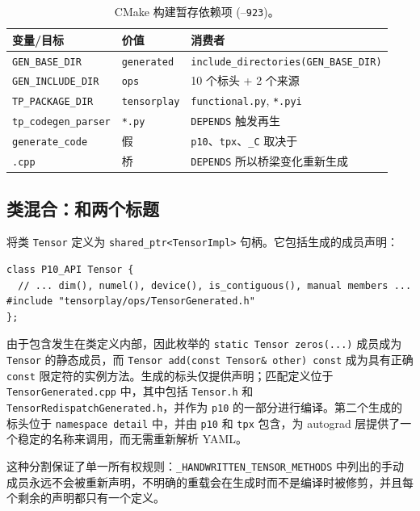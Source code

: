 \begin{table}[H]
\centering
\caption{CMake 构建暂存依赖项 (--\texttt{923})。}
\label{tab:cmakedep}
\small
\begin{tabular}{lll}
\toprule
变量/目标 & 价值 & 消费者 \\
\midrule
\texttt{GEN\_BASE\_DIR} & \texttt{generated} & \texttt{include\_directories(GEN\_BASE\_DIR)} \\
\texttt{GEN\_INCLUDE\_DIR} & \texttt{ops} & 10 个标头 + 2 个来源 \\
\texttt{TP\_PACKAGE\_DIR} & \texttt{tensorplay} & \texttt{functional.py}, \texttt{*.pyi} \\
\texttt{tp\_codegen\_parser} & \texttt{*.py} & \texttt{DEPENDS} 触发再生 \\
\texttt{generate\_code} & 假 & \texttt{p10}、\texttt{tpx}、\texttt{\_C} 取决于 \\
\texttt{.cpp} & 桥 & \texttt{DEPENDS} 所以桥梁变化重新生成 \\
\bottomrule
\end{tabular}
\end{table}

\subsection{类混合：和两个标题}
\label{sec:codegen_class_mixing}

将类 \texttt{Tensor} 定义为 \texttt{shared\_ptr<TensorImpl>} 句柄。它包括生成的成员声明：

\begin{lstlisting}[caption={mixing site.}, label=lst:mixing, style=cppstyle]
class P10_API Tensor {
  // ... dim(), numel(), device(), is_contiguous(), manual members ...
#include "tensorplay/ops/TensorGenerated.h"
};
\end{lstlisting}

由于包含发生在类定义内部，因此枚举的 \texttt{static Tensor zeros(...)} 成员成为 \texttt{Tensor} 的静态成员，而 \texttt{Tensor add(const Tensor\& other) const} 成为具有正确 \texttt{const} 限定符的实例方法。生成的标头仅提供声明；匹配定义位于 \texttt{TensorGenerated.cpp} 中，其中包括 \texttt{Tensor.h} 和 \texttt{TensorRedispatchGenerated.h}，并作为 \texttt{p10} 的一部分进行编译。第二个生成的标头位于 \texttt{namespace detail} 中，并由 \texttt{p10} 和 \texttt{tpx} 包含，为 autograd 层提供了一个稳定的名称来调用，而无需重新解析 YAML。

这种分割保证了单一所有权规则：\texttt{\_HANDWRITTEN\_TENSOR\_METHODS} 中列出的手动成员永远不会被重新声明，不明确的重载会在生成时而不是编译时被修剪，并且每个剩余的声明都只有一个定义。

